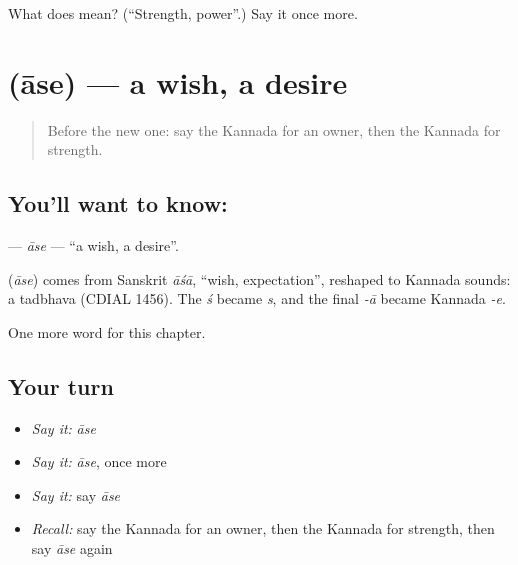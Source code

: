 \begin{tcolorbox}[breakable,colback=teal!4,colframe=teal!35!black,title={Before you move on}]
What does  mean? (\textquotedblleft{}Strength, power\textquotedblright{}.) Say it once more.
\end{tcolorbox}
\section[\texorpdfstring{\kn{ಆಸೆ} (āse)}{ಆಸೆ (āse)}]{ (āse) — a wish, a desire}

\label{lesson:KA-C113-ase}



\begin{quote}
Before the new one: say the Kannada for an owner, then the Kannada for strength.
\end{quote}

\subsection*{You'll want to know: }
\textbf{} — \emph{āse} — \textquotedblleft{}a wish, a desire\textquotedblright{}.

\begin{cousinweb}
\textbf{} (\emph{āse}) comes from Sanskrit \emph{āśā}, \textquotedblleft{}wish, expectation\textquotedblright{}, reshaped to Kannada sounds: a tadbhava (CDIAL 1456). The \emph{ś} became \emph{s}, and the final \emph{-ā} became Kannada \emph{-e}.
\end{cousinweb}

\begin{grammarlens}[title={What you've built}]
One more word for this chapter.
\end{grammarlens}

\subsection*{Your turn}
\begin{itemize}
\raggedright
  \item \emph{Say it:} \emph{āse}
  \item \emph{Say it:} \emph{āse}, once more
  \item \emph{Say it:} say \emph{āse}
  \item \emph{Recall:} say the Kannada for an owner, then the Kannada for strength, then say \emph{āse} again
\end{itemize}


